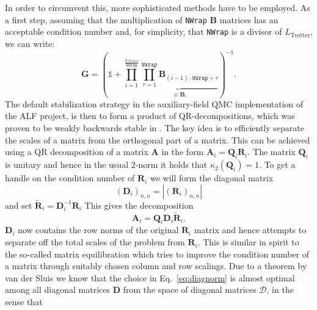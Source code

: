 In order to circumvent this, more sophisticated methods have to be employed. As a first step, assuming that the multiplication of \texttt{NWrap} $\bm{B}$ matrices has an acceptable condition number and, for simplicity, that \texttt{NWrap} is a divisor of $L_{\text{Trotter}}$, we can write: 
\begin{equation}
\bm{G} = \left( \mathds{1} + \prod\limits_{ i = 1}^{\frac{L_{\text{Trotter}}} {\texttt{NWrap}}}       \underbrace{\prod_{\tau=1}^{\texttt{NWrap}} \bm{B}_{(i-1)  \cdot  \texttt{NWrap}+ \tau} }_{ \equiv \mathcal{\bm{B}}_i}\right)^{-1}.
\end{equation}
The default stabilization strategy in the auxiliary-field QMC implementation of the ALF project, is then to form a product of QR-decompositions, which was proven to be weakly backwards stable in \cite{Bai2011}.
The key idea is to efficiently separate the scales of a matrix from the orthogonal part of a matrix.
This can be achieved using a QR decomposition of a matrix $\bm{A}$ in the form $\bm{A}_i = \bm{Q}_i \bm{R}_i$. The matrix $\bm{Q}_i$ is unitary and hence in the usual $2$-norm it holds that $\kappa_2(\bm{Q}_i) = 1$.
To get a handle on the condition number of $\bm{R}_i$ we will form the
diagonal matrix
\begin{equation}
(\bm{D}_i)_{n,n} = |(\bm{R}_i)_{n,n}|
\label{eq:diagnorm}
\end{equation}
and set $\tilde{\bm{R}}_i = \bm{D}_i^{-1} \bm{R}_i$
This gives the decomposition
\begin{equation}
\bm{A}_i = \bm{Q}_i \bm{D}_i \tilde{\bm{R}}_i.
\end{equation}
$\bm{D}_i$ now contains the row norms of the original $\bm{R}_i$ matrix and hence attempts to separate off the total scales of the problem from $\bm{R}_i$.
This is similar in spirit to the so-called matrix equilibration which tries to improve the condition number of a matrix through suitably chosen column and row scalings.
Due to a theorem by van der Sluis \cite{vanderSluis1969} we know that the choice in Eq.~\eqref{eq:diagnorm} is almost optimal among all diagonal matrices $\bm{D}$ from the space of diagonal matrices $\mathcal{D}$, in the sense that
